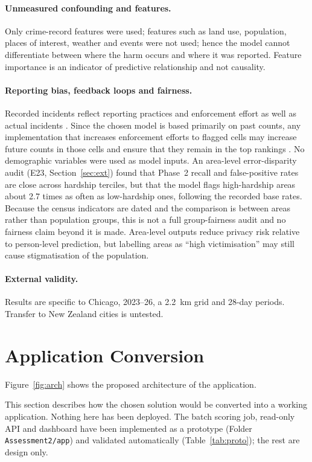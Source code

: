 \documentclass[11pt,a4paper]{report}
\begin{document}
\paragraph{Unmeasured confounding and features.} Only crime-record features were used; features such as land use, population, places of interest, weather and events were not used; hence the model cannot differentiate between where the harm occurs and where it was reported. Feature importance is an indicator of predictive relationship and not causality.

\paragraph{Reporting bias, feedback loops and fairness.} Recorded incidents reflect reporting practices and enforcement effort as well as actual incidents \citep{lum2016,richardson2019}. Since the chosen model is based primarily on past counts, any implementation that increases enforcement efforts to flagged cells may increase future counts in those cells and ensure that they remain in the top rankings \citep{ensign2018}. No demographic variables were used as model inputs. An area-level error-disparity audit (E23, Section~\ref{sec:ext}) found that Phase~2 recall and false-positive rates are close across hardship terciles, but that the model flags high-hardship areas about 2.7 times as often as low-hardship ones, following the recorded base rates. Because the census indicators are dated and the comparison is between areas rather than population groups, this is not a full group-fairness audit and no fairness claim beyond it is made. Area-level outputs reduce privacy risk relative to person-level prediction, but labelling areas as ``high victimisation'' may still cause stigmatisation of the population.

\paragraph{External validity.} Results are specific to Chicago, 2023--26, a 2.2~km grid and 28-day periods. Transfer to New Zealand cities is untested.

\section{Application Conversion}
\label{sec:app}
Figure~\ref{fig:arch} shows the proposed architecture of the application.

This section describes how the chosen solution would be converted into a working application. Nothing here has been deployed. The batch scoring job, read-only API and dashboard have been implemented as a prototype (Folder \texttt{Assessment2/app}) and validated automatically (Table~\ref{tab:proto}); the rest are design only.
\end{document}
